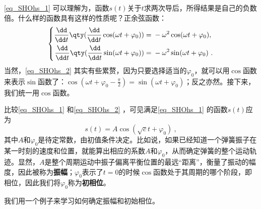 \autoref{eq_SHOhs_1} 可以理解为，函数$s(t)$关于$t$求两次导后，所得结果是自己的负数倍。什么样的函数具有这样的性质呢？正余弦函数：
\begin{equation}\label{eq_SHOhs_2}
\left\{
\begin{aligned}
    \frac{\dd}{\dd t}\qty(\frac{\dd}{\dd t}\cos(\omega t+\varphi_0)) ={}& -\omega^2\cos(\omega t+\varphi_0), \\
    \frac{\dd}{\dd t}\qty(\frac{\dd}{\dd t}\sin(\omega t+\varphi_0)) ={}& -\omega^2\sin(\omega t+\varphi_0)~. 
\end{aligned}
\right. 
\end{equation}
当然，\autoref{eq_SHOhs_2} 其实有些累赘，因为只要选择适当的$\varphi_0$，就可以用$\cos$函数来表示$\sin$函数了：$\cos(\omega t+\varphi_0-\frac{\pi}{2})=\sin(\omega t+\varphi_0)$；反之亦然。接下来，我们统一用$\cos$函数。

比较\autoref{eq_SHOhs_1} 和\autoref{eq_SHOhs_2} ，可见满足\autoref{eq_SHOhs_1} 的函数$s(t)$应为
\begin{equation}
s(t) = A\cos(\sqrt{c}t+\varphi_0)~,  
\end{equation}
其中$A$和$\varphi_0$是待定常数，由初值条件决定。比如说，如果已经知道一个弹簧振子在某一时刻的速度和位置，就能算出相应的系数$A$和$\varphi_0$，从而确定弹簧的整个运动轨迹。显然，$A$是整个周期运动中振子偏离平衡位置的最远“距离”，衡量了振动的幅度，因此被称为\textbf{振幅}；$\varphi_0$表示了$t=0$的时候$\cos$函数处于其周期的哪个阶段，即相位，因此我们将$\varphi_0$称为\textbf{初相位}。

我们用一个例子来学习如何确定振幅和初始相位。



